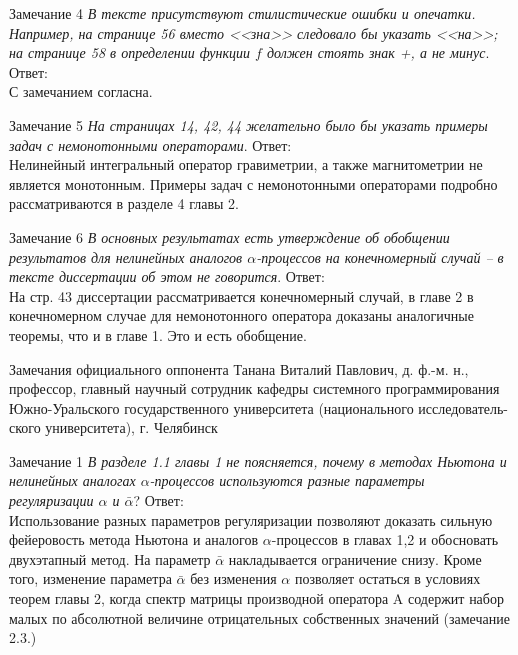 \documentclass[10pt,pdf, mathserif, hyperref={unicode}]{beamer}
\begin{document}
\begin{frame}{Замечание 4}
	\textit {В тексте присутствуют стилистические ошибки и опечатки. Например, на странице 56 вместо <<зна>> следовало бы указать <<на>>; на странице 58 в определении функции $f$ должен стоять знак +, а не минус}.
	\vskip 5mm
	Ответ:\\
	С замечанием согласна.
\end{frame}

\begin{frame}{Замечание 5}
	\textit {На страницах 14, 42, 44 желательно было бы указать примеры задач с немонотонными операторами}.
	\vskip 5mm
	Ответ:\\
	Нелинейный интегральный оператор гравиметрии, а также магнитометрии не является монотонным. Примеры задач с немонотонными операторами подробно рассматриваются в разделе 4 главы 2. 
\end{frame}

\begin{frame}{Замечание 6}
	\textit {В основных результатах есть утверждение об обобщении результатов для нелинейных аналогов $\alpha$-процессов на конечномерный случай – в тексте диссертации об этом не говорится}.
	\vskip 5mm
	Ответ:\\
	На стр. 43 диссертации рассматривается конечномерный случай, в главе 2 в конечномерном случае для немонотонного оператора доказаны аналогичные теоремы, что и в главе 1. Это и есть обобщение.
\end{frame}

\begin{frame}{Замечания официального оппонента}
	Танана Виталий Павлович, д. ф.-м. н., профессор, главный научный сотрудник кафедры системного
	программирования Южно-Уральского государственного университета (национального исследователь-ского университета), г. Челябинск
	
\end{frame}

\begin{frame}{Замечание 1}
	\textit{В  разделе 1.1  главы 1 не поясняется, почему  в методах Ньютона и нелинейных аналогах $\alpha$-процессов используются разные параметры регуляризации $\alpha$ и $\bar{\alpha}$}?
	\vskip 5mm
	Ответ:\\
	Использование разных параметров регуляризации позволяют доказать сильную фейеровость метода Ньютона и аналогов $\alpha$-процессов в главах 1,2 и обосновать двухэтапный метод. На параметр $\bar{\alpha}$ накладывается ограничение снизу. Кроме того, изменение параметра $\bar{\alpha}$  без изменения $\alpha$ позволяет остаться в условиях теорем главы 2, когда спектр матрицы производной оператора A содержит набор малых по абсолютной величине отрицательных собственных значений (замечание 2.3.)
\end{frame}
\end{document}
